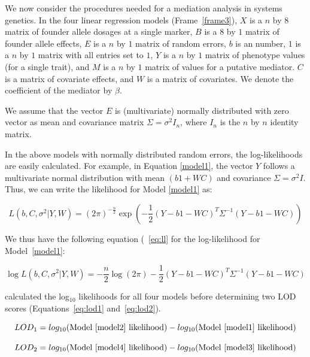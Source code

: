 \documentclass[oneside]{book}\usepackage[]{graphicx}\usepackage[]{color}
\begin{document}
We now consider the procedures needed for a mediation analysis in systems genetics.
In the four linear regression models (Frame~\ref{frame3}), $X$ is a $n$ by $8$ matrix of 
founder allele dosages at a single marker, $B$ is a $8$ by $1$ matrix of founder allele 
effects, $E$ is a $n$ by $1$ matrix of random errors, $b$ is an number, $1$ is 
a $n$ by $1$ matrix with all entries set to $1$, $Y$ is a $n$ by $1$ matrix of 
phenotype values (for a single trait), and $M$ is a $n$ by $1$ matrix of values for a putative mediator. 
$C$ is a matrix of covariate effects, and $W$ is a matrix of covariates. 
We denote the coefficient of the mediator by $\beta$.

We assume that the vector $E$ is (multivariate) normally distributed with zero vector as mean and covariance matrix $\Sigma = \sigma^2I_n$, where $I_n$ is the $n$ by $n$ identity matrix.

In the above models with normally distributed random errors, the log-likelihoods are easily calculated. For example, in Equation \ref{model1}, the vector $Y$ follows a multivariate normal distribution with mean $(b1 + WC)$ and covariance $\Sigma = \sigma^2I$. Thus, we can write the likelihood for Model \ref{model1} as:

\begin{equation}
    L(b, C, \sigma^2| Y, W) = (2\pi)^{- \frac{n}{2}}\exp{ \left(- \frac{1}{2}(Y - b1 - WC)^T\Sigma^{-1}(Y - b1 - WC)\right)}
\end{equation}

We thus have the following equation (~\ref{eq:ll} for the log-likelihood for Model~\ref{model1}:

\begin{equation}
    \log L(b, C, \sigma^2 | Y, W) = - \frac{n}{2}\log (2\pi) - \frac{1}{2} (Y - b1 - WC)^T\Sigma^{-1}(Y - b1 - WC)\label{eq:ll}
\end{equation}


\citet{chick2016defining} calculated the log$_{10}$ likelihoods for all four models before determining two LOD scores (Equations~\ref{eq:lod1} and~\ref{eq:lod2}).


\begin{equation}
LOD_1 = log_{10}(\text{Model~\ref{model2} likelihood}) - log_{10}(\text{Model~\ref{model1} likelihood})\label{eq:lod1}
\end{equation}

\begin{equation}
LOD_2 = log_{10}(\text{Model~\ref{model4} likelihood}) - log_{10}(\text{Model~\ref{model3} likelihood})\label{eq:lod2}
\end{equation}
\end{document}
